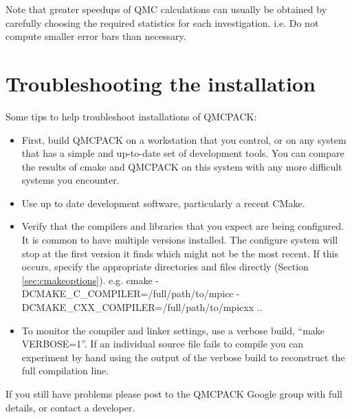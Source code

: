 Note that greater speedups of QMC calculations can usually be obtained by
carefully choosing the required statistics for each
investigation. i.e. Do not compute smaller error bars than necessary.

\section{Troubleshooting the installation}
\label{sec:troubleshoot}
Some tips to help troubleshoot installations of QMCPACK:
\begin{itemize}
\item First, build QMCPACK on a workstation that you control, or on any
  system that has a simple and up-to-date set of development
  tools. You can compare the results of cmake and QMCPACK on this
  system with any more difficult systems you encounter.
\item Use up to date development software, particularly a recent
  CMake.
\item Verify that the compilers and libraries that you expect are
  being configured. It is common to have multiple versions
  installed. The configure system will stop at the first version it
  finds which might not be the most recent. If this occurs, specify the appropriate
  directories and files directly (Section
  \ref{sec:cmakeoptions}). e.g. cmake -DCMAKE\_C\_COMPILER=/full/path/to/mpicc -DCMAKE\_CXX\_COMPILER=/full/path/to/mpicxx ..
\item To monitor the compiler and linker settings, use a verbose build, ``make
  VERBOSE=1''. If an individual source file fails to compile you
  can experiment by hand using the output of the verbose build to
  reconstruct the full compilation line.
\end{itemize}

If you still have problems please post to the QMCPACK Google group with full
details, or contact a developer.
